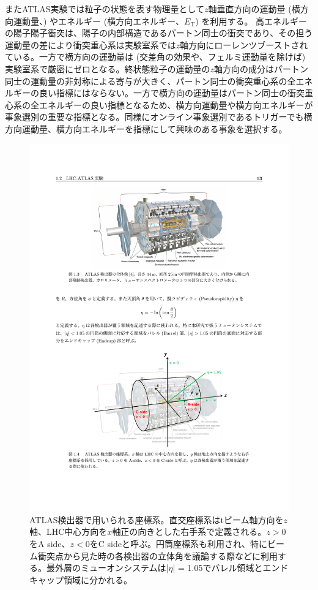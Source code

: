 またATLAS実験では粒子の状態を表す物理量として$z$軸垂直方向の運動量 (横方向運動量、\pt) やエネルギー (横方向エネルギー、$E_{\mathrm{T}}$) を利用する。
高エネルギーの陽子陽子衝突は、陽子の内部構造であるパートン同士の衝突であり、その担う運動量の差により衝突重心系は実験室系では$z$軸方向にローレンツブーストされている。一方で横方向の運動量は (交差角の効果や、フェルミ運動量を除けば) 実験室系で厳密にゼロとなる。終状態粒子の運動量の$z$軸方向の成分はパートン同士の運動量の非対称による寄与が大きく、パートン同士の衝突重心系の全エネルギーの良い指標にはならない。一方で横方向の運動量はパートン同士の衝突重心系の全エネルギーの良い指標となるため、横方向運動量や横方向エネルギーが事象選別の重要な指標となる。同様にオンライン事象選別であるトリガーでも横方向運動量、横方向エネルギーを指標にして興味のある事象を選択する。

\begin{figure} 
\centering
\includegraphics[width=16cm]{fig/Intro/ATLAScordination.pdf}
\caption[ATLAS検出器における座標系]{ATLAS検出器で用いられる座標系。直交座標系はtビーム軸方向を$z$軸、LHC中心方向を$x$軸正の向きとした右手系で定義される。$z>0$をA side、$z<0$をC sideと呼ぶ。円筒座標系も利用され、特にビーム衝突点から見た時の各検出器の立体角を議論する際などに利用する。最外層のミューオンシステムは|$\eta$| = 1.05でバレル領域とエンドキャップ領域に分かれる。}
\label{ATLAScordination}
\end{figure}

